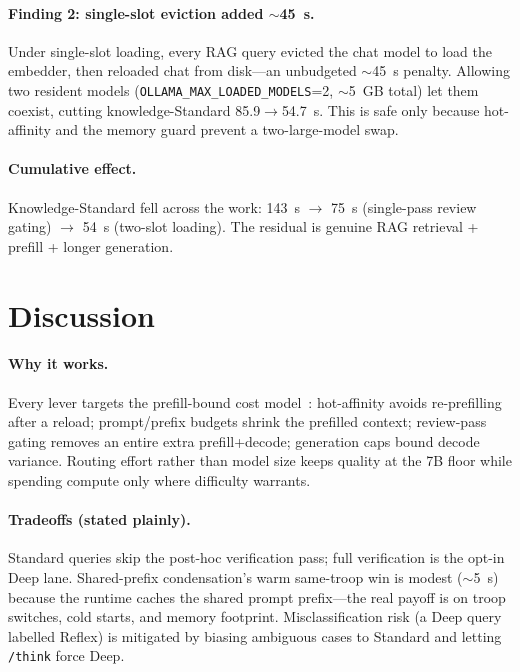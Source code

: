 \documentclass[10pt,twocolumn]{article}
\begin{document}
\paragraph{Finding 2: single-slot eviction added $\sim$45~s.}
Under single-slot loading, every RAG query evicted the chat model to load
the embedder, then reloaded chat from disk---an unbudgeted $\sim$45~s
penalty. Allowing two resident models
(\texttt{OLLAMA\_MAX\_LOADED\_MODELS}=2, $\sim$5~GB total) let them
coexist, cutting knowledge-Standard 85.9$\to$54.7~s. This is safe only
because hot-affinity and the memory guard prevent a two-large-model swap.

\paragraph{Cumulative effect.}
Knowledge-Standard fell across the work: 143~s $\to$ 75~s (single-pass
review gating) $\to$ 54~s (two-slot loading). The residual is genuine RAG
retrieval + prefill + longer generation.

\section{Discussion}
\label{sec:discussion}

\paragraph{Why it works.}
Every lever targets the prefill-bound cost model~\cite{khan2026prefill}:
hot-affinity avoids re-prefilling after a reload; prompt/prefix budgets
shrink the prefilled context; review-pass gating removes an entire extra
prefill+decode; generation caps bound decode variance. Routing effort
rather than model size keeps quality at the 7B floor while spending
compute only where difficulty warrants.

\paragraph{Tradeoffs (stated plainly).}
Standard queries skip the post-hoc verification pass; full verification is
the opt-in Deep lane. Shared-prefix condensation's warm same-troop win is
modest ($\sim$5~s) because the runtime caches the shared prompt prefix---the
real payoff is on troop switches, cold starts, and memory footprint.
Misclassification risk (a Deep query labelled Reflex) is mitigated by
biasing ambiguous cases to Standard and letting \texttt{/think} force Deep.
\end{document}

